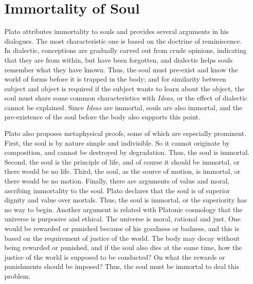 \documentclass[11pt]{article}
\begin{document}
\section{Immortality of Soul}
Plato attributes immortality to souls and provides several arguments in his dialogues. 
The most characteristic one is based on the doctrine of reminiscence. 
In dialectic, conceptions are gradually carved out from crude opinions, indicating that they are from within, but have been forgotten, and dialectic helps souls remember what they have known. 
Thus, the soul must pre-exist and know the world of forms before it is trapped in the body; 
and for similarity between subject and object is required if the subject wants to learn about the object, the soul must share some common characteristics with \textit{Ideas}, or the effect of dialectic cannot be explained. 
Since \textit{Ideas} are immortal, souls are also immortal, and the pre-existence of the soul before the body also supports this point.

\newline

Plato also proposes metaphysical proofs, some of which are especially prominent. 
First, the soul is by nature simple and indivisible. 
So it cannot originate by composition, and cannot be destroyed by degradation. 
Thus, the soul is immortal. 
Second, the soul is the principle of life, and of course it should be immortal, or there would be no life. 
Third, the soul, as the source of motion, is immortal, or there would be no motion.
Finally, there are arguments of value and moral, ascribing immortality to the soul. 
Plato declares that the soul is of superior dignity and value over mortals. 
Thus, the soul is immortal, or the superiority has no way to begin. 
Another argument is related with Platonic cosmology that the universe is purposive and ethical. 
The universe is moral, rational and just. 
One would be rewarded or punished because of his goodness or badness, and this is based on the requirement of justice of the world. 
The body may decay without being rewarded or punished, and if the soul also dies at the same time, how the justice of the world is supposed to be conducted? 
On what the rewards or punishments should be imposed? 
Thus, the soul must be immortal to deal this problem.

\newline
\end{document}
